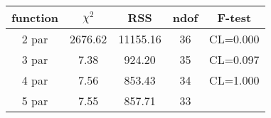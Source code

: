 \begin{tabular}{c|c|c|c|c}
function & $\chi^2$ & RSS & ndof & F-test \\
\hline
2 par & 2676.62 & 11155.16 & 36 & CL=0.000 \\
3 par & 7.38 & 924.20 & 35 & CL=0.097 \\
4 par & 7.56 & 853.43 & 34 & CL=1.000 \\
5 par & 7.55 & 857.71 & 33 & \\
\hline
\end{tabular}